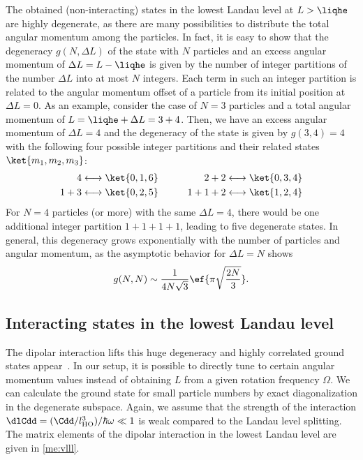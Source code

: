 The obtained (non-interacting) states in the lowest Landau level at $L>\liqhe$ are highly degenerate, as there are many possibilities to distribute the total angular momentum among the particles.
In fact, it is easy to show that the degeneracy $g(N, \Delta L)$ of the state with $N$ particles and an excess angular momentum of $\Delta L=L-\liqhe$ is given by the number
of integer partitions of the number $\Delta L$ into at most $N$ integers.
Each term in such an integer partition is related to the angular momentum offset of a particle from its initial position at $\Delta L = 0$.
As an example, consider the case of $N=3$ particles and a total angular momentum of $L=\liqhe + \Delta L = 3+4$. Then, we have an excess angular momentum of $\Delta L=4$ and the degeneracy of the state is given by $g(3,4)=4$ with the following four possible integer partitions and their related states $\ket{m_1,m_2,m_3}$:
\begin{align}
4 &\longleftrightarrow \ket{0,1,6} &\qquad 2+2 \longleftrightarrow \ket{0,3,4}\\
1+3 &\longleftrightarrow \ket{0,2,5}&\qquad 1+1+2 \longleftrightarrow \ket{1,2,4}
\end{align}
For $N = 4$ particles (or more) with the same $\Delta L=4$, there would be one additional integer partition $1+1+1+1$, leading to five degenerate states.
In general, this degeneracy grows exponentially with the number of particles and angular momentum, as the asymptotic behavior for $\Delta L = N$ shows~\cite{Hardy1918}
\begin{align}
g(N,N) \sim \frac{1}{4N\sqrt{3}} \ef{\pi \sqrt{\frac{2N}{3}}}.
\end{align}



\subsection{Interacting states in the lowest Landau level}
The dipolar interaction lifts this huge degeneracy and highly correlated ground states appear~\cite{Cooper2005,Baranov2005,Osterloh2007,Qiu2011,Grass2011,Zhang2014}. In our setup, it is possible to directly tune to certain angular momentum values instead of obtaining $L$ from a given rotation frequency $\Omega$.
We can calculate the ground state for small particle numbers by exact diagonalization in the degenerate subspace.
Again, we assume that the strength of the interaction $\dlCdd=(\Cdd/l_\text{HO}^3)/\hbar\omega \ll 1$ is weak compared to the Landau level splitting.
The matrix elements of the dipolar interaction in the lowest Landau level are given in \cref{me:vlll}.

